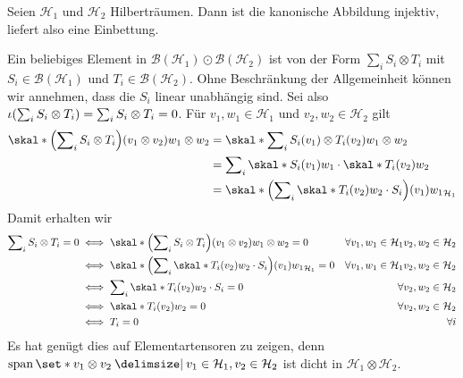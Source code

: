 Seien $\mathcal{H}_1$ und $\mathcal{H}_2$ Hilberträumen.
Dann ist die kanonische Abbildung
injektiv, liefert also eine Einbettung.
\begin{beweis}
	Ein beliebiges Element in $\mathcal{B}(\mathcal{H}_1) \odot \mathcal{B}(\mathcal{H}_2)$ ist von der Form $\sum_{i} S_i \otimes T_i$ mit
	$S_i \in \mathcal{B}(\mathcal{H}_1)$ und $T_i \in \mathcal{B}(\mathcal{H}_2)$.
	Ohne Beschränkung der Allgemeinheit können wir annehmen, dass die $S_i$ linear unabhängig sind.
	Sei also $\iota \enbrace*{\sum_{i} S_i \otimes T_i}=\sum_{i} S_i \otimes T_i=0$.
	Für $v_1,w_1 \in \mathcal{H}_1$ und $v_2,w_2 \in \mathcal{H}_2$ gilt
	\begin{align}
		\skal*{\enbrace*{\sum\nolimits_{i} S_i \otimes T_i}(v_1 \otimes v_2)}{w_1 \otimes w_2} &= \skal*{\sum\nolimits_i S_i(v_1) \otimes T_i(v_2)}{w_1 \otimes w_2}\\
		&= \sum\nolimits_i \skal*{S_i(v_1)}{w_1} \cdot \skal*{T_i(v_2)}{w_2} \\
		&= \skal*{\enbrace*{\sum\nolimits_i \skal*{T_i (v_2)}{w_2} \cdot S_i}(v_1)}{w_1}_{\mathcal{H}_1}
	\end{align}
	Damit erhalten wir 
	\begin{align}
		\sum\nolimits_{i} S_i \otimes T_i =0 &\iff \skal*{\enbrace*{\sum\nolimits_{i} S_i \otimes T_i}(v_1 \otimes v_2)}{w_1 \otimes w_2} =0 & \forall v_1,w_1 \in \mathcal{H}_1 v_2,w_2 \in \mathcal{H}_2 \\
		&\iff \skal*{\enbrace*{\sum\nolimits_i \skal*{T_i (v_2)}{w_2} \cdot S_i}(v_1)}{w_1}_{\mathcal{H}_1} =0 & \forall v_1,w_1 \in \mathcal{H}_1 v_2,w_2 \in \mathcal{H}_2\\
		&\iff \sum\nolimits_i \skal*{T_i(v_2)}{w_2} \cdot S_i =0 & \forall v_2,w_2 \in \mathcal{H}_2 \\
		&\iff \skal*{T_i(v_2)}{w_2} =0 & \forall v_2,w_2 \in \mathcal{H}_2 \\
		&\iff T_i =0 & \forall i
	\end{align}
	Es hat genügt dies auf Elementartensoren zu zeigen, denn $\Span \set*{v_1 \otimes v_2 \given v_1 \in \mathcal{H}_1 , v_2 \in \mathcal{H}_2}$ ist dicht in $\mathcal{H}_1 \otimes \mathcal{H}_2$.
\end{beweis}












